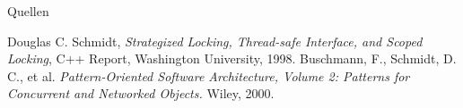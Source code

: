 \documentclass[aspectratio=169,10pt]{beamer}
\begin{document}
\begin{frame}[allowframebreaks]{Quellen}
  \small
  \begin{thebibliography}{9}
    Douglas C. Schmidt,
    \emph{Strategized Locking, Thread-safe Interface, and Scoped Locking},
    C++ Report, Washington University, 1998.
    Buschmann, F., Schmidt, D. C., et al.
    \emph{Pattern-Oriented Software Architecture, Volume 2: Patterns for Concurrent and Networked Objects.}
    Wiley, 2000.
  \end{thebibliography}
\end{frame}
\end{document}
